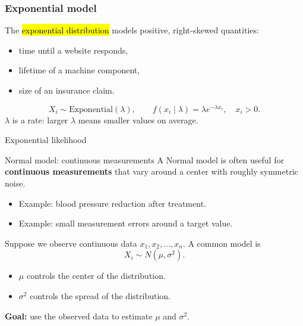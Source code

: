 \documentclass[slidestop,compress,mathserif]{beamer}
\begin{document}
\begin{frame}
\frametitle{Exponential model}

The \hl{exponential distribution} models positive, right-skewed quantities:
\begin{itemize}
\item time until a website responds,
\item lifetime of a machine component,
\item size of an insurance claim.
\end{itemize}
\[
X_i\sim \text{Exponential}(\lambda), \qquad f(x_i\mid\lambda)=\lambda e^{-\lambda x_i}, \quad x_i>0.
\]
\(\lambda\) is a rate: larger \(\lambda\) means smaller values on average.
\end{frame}
\begin{frame}{Exponential likelihood}
\end{frame}
\begin{frame}{Normal model: continuous measurements}
A Normal model is often useful for \textbf{continuous measurements} that vary around a center with roughly symmetric noise. 
\begin{itemize} 
\item Example: blood pressure reduction after treatment. 
\item Example: small measurement errors around a target value. 
\end{itemize}
Suppose we observe continuous data $x_1,x_2,\ldots,x_n$. A common model is
\[
X_i \sim N(\mu,\sigma^2).
\]
\begin{itemize}
\item $\mu$ controls the center of the distribution.
\item $\sigma^2$ controls the spread of the distribution.
\end{itemize}

\textbf{Goal:} use the observed data to estimate $\mu$ and $\sigma^2$.
\end{frame}
\end{document}
